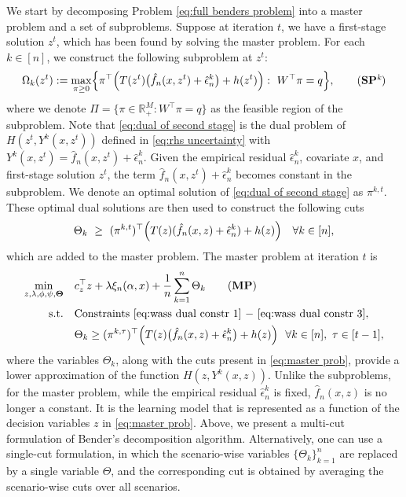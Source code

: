 \documentclass[onefignum,onetabnum]{siamart251216}
\begin{document}
We start by decomposing Problem \eqref{eq:full benders problem} into a master problem and a set of subproblems. Suppose at iteration $t$, we have a first-stage solution $z^t$, which has been found by solving the master problem.  For each $k\in[n]$, we construct the following subproblem at $z^t$:
\begin{align} 
    \Omega_k(z^t) : = \max_{\pi \ge 0} \Bigl\{\pi^\top \Bigl(T(z^t) \bigl(\hat{f}_n(x,z^t) + \hat{\epsilon}_n^k\bigr) + h(z^t)\Bigr) :\ W^\top \pi = q\Bigr\}, 
    \tag{\textbf{SP}\textsuperscript{\it k}} 
    \label{eq:dual of second stage}
\end{align}
where we denote $\Pi = \{\pi \in \mathbb{R}_+^M: W^\top \pi = q\}$ as the feasible region of the subproblem. Note that \eqref{eq:dual of second stage} is the dual problem of $H(z^t,Y^k(x,z^t))$ defined in \eqref{eq:rhs uncertainty} with $Y^k(x,z^t)=\hat{f}_n(x,z^t) + \hat{\epsilon}_n^k$. Given the empirical residual $\hat{\epsilon}_n^k$, covariate $x$, and first-stage solution $z^t$, the term $\hat{f}_n(x,z^t) + \hat{\epsilon}_n^k$ becomes constant in the subproblem. We denote an optimal solution of \eqref{eq:dual of second stage} as $\pi^{k,t}$. These optimal dual solutions are then used to construct the following cuts
\begin{align}\label{eq:benders multi-cut}
\Theta_k \ \ge\ (\pi^{k,t})^\top\Bigl(T(z)(\hat{f}_n(x,z) + \hat{\epsilon}_n^k)+h(z)\Bigr)\ \ \ \forall k\in[n],
\end{align}
which are added to the master problem. The master problem at iteration $t$ is
\begin{align} 
        \min_{z, \lambda, \phi, \psi, \mathbf{\Theta}} \quad & c_z^\top z + \lambda \xi_n(\alpha,x) + \frac{1}{n} \sum_{k=1}^n\Theta_k \tag{{\bf MP}} \label{eq:master prob} \\
    \textrm{s.t.}\quad & \text{Constraints}\ \eqref{eq:wass dual constr 1}\ {-}\ \eqref{eq:wass dual constr 3}, \nonumber \\
    \quad & \Theta_k \ge (\pi^{k,\tau})^\top \Bigl(T(z) \bigl(\hat{f}_n(x,z) + \hat{\epsilon}_n^k\bigr) + h(z)\Bigr)\ \ \forall k\in[n],\ \tau \in [t-1], \nonumber
\end{align}
where the variables $\Theta_k$, along with the cuts present in \eqref{eq:master prob}, provide a lower approximation of the function $H(z,Y^k(x,z))$. Unlike the subproblems, for the master problem, while the empirical residual $\hat{\epsilon}_n^k$ is fixed, $\hat{f}_n(x,z)$ is no longer a constant. It is the learning model that is represented as a function of the decision variables $z$ in \eqref{eq:master prob}. Above, we present a multi-cut formulation of Bender's decomposition algorithm. Alternatively, one can use a single-cut formulation, in which the scenario-wise variables $\{\Theta_k\}_{k=1}^n$ are replaced by a single variable $\Theta$, and the corresponding cut is obtained by averaging the scenario-wise cuts over all scenarios.
\end{document}
